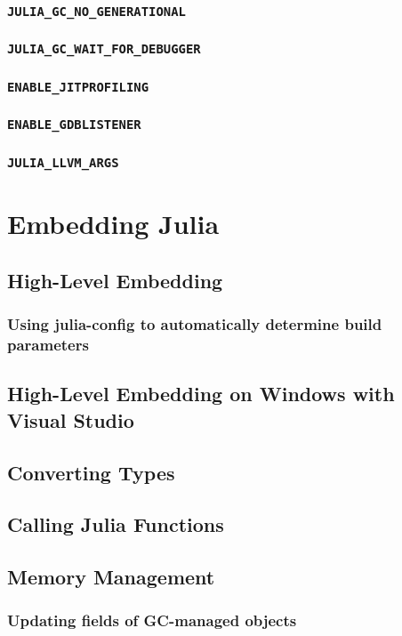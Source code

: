    \subsection{\texttt{JULIA\_GC\_NO\_GENERATIONAL}}
    \subsection{\texttt{JULIA\_GC\_WAIT\_FOR\_DEBUGGER}}
    \subsection{\texttt{ENABLE\_JITPROFILING}}
    \subsection{\texttt{ENABLE\_GDBLISTENER}}
    \subsection{\texttt{JULIA\_LLVM\_ARGS}}
  \chapter{Embedding Julia}
    \section{High-Level Embedding}
    \subsection{Using julia-config to automatically determine build parameters}
    \section{High-Level Embedding on Windows with Visual Studio}
    \section{Converting Types}
    \section{Calling Julia Functions}
    \section{Memory Management}
    \subsection{Updating fields of GC-managed objects}
